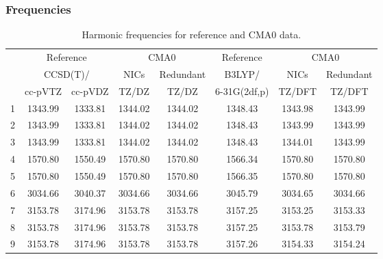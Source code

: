 \documentclass[10pt,oneside]{article}
\begin{document}
\begin{table}[h!]
\subsubsection*{Frequencies}
\centering
\caption{Harmonic frequencies for reference and CMA0 data.}
\begin{tabular}{cccccccc}
\toprule
{} & \multicolumn{2}{c}{Reference} & \multicolumn{2}{c}{CMA0} &    Reference & \multicolumn{2}{c}{CMA0} \\
{} & \multicolumn{2}{c}{CCSD(T)/} &    NICs &  Redundant &       B3LYP/ &    NICs & Redundant \\
{} &   cc-pVTZ & cc-pVDZ &   TZ/DZ &      TZ/DZ & 6-31G(2df,p) &  TZ/DFT &    TZ/DFT \\
\midrule
1 &   1343.99 & 1333.81 & 1344.02 &    1344.02 &      1348.43 & 1343.98 &   1343.99 \\
2 &   1343.99 & 1333.81 & 1344.02 &    1344.02 &      1348.43 & 1343.99 &   1343.99 \\
3 &   1343.99 & 1333.81 & 1344.02 &    1344.02 &      1348.43 & 1344.01 &   1343.99 \\
4 &   1570.80 & 1550.49 & 1570.80 &    1570.80 &      1566.34 & 1570.80 &   1570.80 \\
5 &   1570.80 & 1550.49 & 1570.80 &    1570.80 &      1566.35 & 1570.80 &   1570.80 \\
6 &   3034.66 & 3040.37 & 3034.66 &    3034.66 &      3045.79 & 3034.65 &   3034.66 \\
7 &   3153.78 & 3174.96 & 3153.78 &    3153.78 &      3157.25 & 3153.25 &   3153.33 \\
8 &   3153.78 & 3174.96 & 3153.78 &    3153.78 &      3157.25 & 3153.78 &   3153.79 \\
9 &   3153.78 & 3174.96 & 3153.78 &    3153.78 &      3157.26 & 3154.33 &   3154.24 \\
\bottomrule
\end{tabular}
\end{table}
\end{document}
